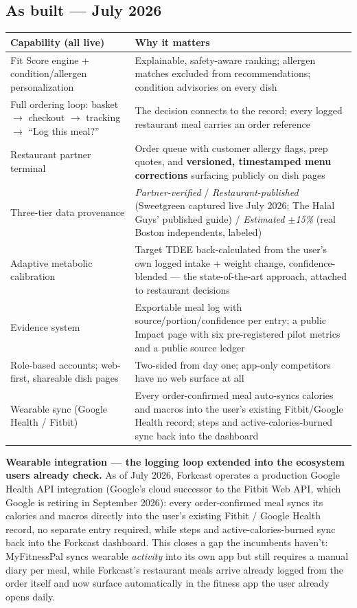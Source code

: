 \documentclass[10pt]{article}
\begin{document}
\subsection*{As built --- July 2026}
\begin{tabularx}{\textwidth}{@{}>{\raggedright\arraybackslash}p{5.2cm} L@{}}
\toprule
\textbf{Capability (all live)} & \textbf{Why it matters}\\
\midrule
Fit Score engine + condition/allergen personalization & Explainable, safety-aware ranking; allergen matches excluded from recommendations; condition advisories on every dish\\
Full ordering loop: basket $\to$ checkout $\to$ tracking $\to$ ``Log this meal?'' & The decision connects to the record; every logged restaurant meal carries an order reference\\
Restaurant partner terminal & Order queue with customer allergy flags, prep quotes, and \textbf{versioned, timestamped menu corrections} surfacing publicly on dish pages\\
Three-tier data provenance & \emph{Partner-verified} / \emph{Restaurant-published} (Sweetgreen captured live July 2026; The Halal Guys' published guide) / \emph{Estimated $\pm$15\%} (real Boston independents, labeled)\\
Adaptive metabolic calibration & Target TDEE back-calculated from the user's own logged intake + weight change, confidence-blended --- the state-of-the-art approach, attached to restaurant decisions\\
Evidence system & Exportable meal log with source/portion/confidence per entry; a public Impact page with six pre-registered pilot metrics and a public source ledger\\
Role-based accounts; web-first, shareable dish pages & Two-sided from day one; app-only competitors have no web surface at all\\
Wearable sync (Google Health / Fitbit) & Every order-confirmed meal auto-syncs calories and macros into the user's existing Fitbit/Google Health record; steps and active-calories-burned sync back into the dashboard\\
\bottomrule
\end{tabularx}

\textbf{Wearable integration --- the logging loop extended into the ecosystem users already check.} As of July 2026, Forkcast operates a production Google Health API integration (Google's cloud successor to the Fitbit Web API, which Google is retiring in September 2026): every order-confirmed meal syncs its calories and macros directly into the user's existing Fitbit / Google Health record, no separate entry required, while steps and active-calories-burned sync back into the Forkcast dashboard. This closes a gap the incumbents haven't: MyFitnessPal syncs wearable \emph{activity} into its own app but still requires a manual diary per meal, while Forkcast's restaurant meals arrive already logged from the order itself and now surface automatically in the fitness app the user already opens daily.
\end{document}
